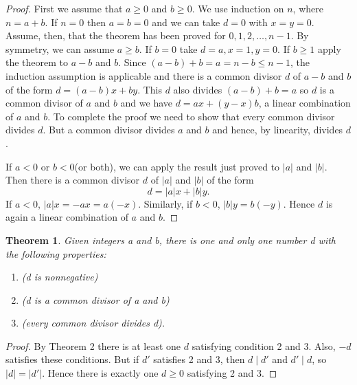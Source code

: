 \documentclass[11pt]{article}
\newtheorem{theorem}{Theorem}
\theoremstyle{definition}
\begin{document}
\begin{proof}
  First we assume that \(a \geq 0\) and \(b \geq 0\). We use induction on \(n\), where
  \(n = a + b\). If \(n = 0\) then \(a = b = 0\) and we can take \(d = 0\) with \(x
  = y = 0\). Assume, then, that the theorem has been proved for \(0,1,2,\ldots,n-1\).
  By symmetry, we can assume \(a \geq b\). If \(b = 0\) take \(d = a, x = 1, y = 0\).
  If \(b \geq 1\) apply the theorem to \(a - b\) and \(b\). Since \((a - b) + b =
  a = n - b \leq n - 1\), the induction assumption is applicable and there is a common
  divisor \(d\) of \(a - b\) and \(b\) of the form \(d = (a-b)x + by\). This \(d\)
  also divides \((a - b) + b = a\) so \(d\) is a common divisor of \(a\) and \(b\)
  and we have \(d = ax + (y - x)b\), a linear combination of \(a\) and \(b\). To
  complete the proof we need to show that every common divisor divides \(d\). But
  a common divisor divides \(a\) and \(b\) and hence, by linearity, divides \(d\).

  If \(a < 0\) or \(b < 0\)(or both), we can apply the result just proved to
  \(| a |\) and \(| b |\). Then there is a common divisor \(d\) of
  \(| a |\) and \(| b |\) of the form
  \[
  d = | a | x + | b | y.
  \]
  If \(a < 0\), \(| a | x = -ax = a(-x)\). Similarly, if \(b < 0\), \(|
  b | y = b(-y)\). Hence \(d\) is again a linear combination of \(a\) and \(b\).
\end{proof}

\begin{theorem}
  Given integers a and b, there is one and only one number d with the following properties:
  \begin{enumerate}
  \item {} (d is nonnegative)
  \item {} (d is a common divisor of a and b)
  \item {} (every common divisor divides d).
  \end{enumerate}
\end{theorem}

\begin{proof}
  By Theorem 2 there is at least one \(d\) satisfying condition 2 and 3. Also,
  \(-d\) satisfies these conditions. But if \(d'\) satisfies 2 and 3, then
  \(d \mid d'\) and \(d' \mid d\), so \(| d | = | d' |\). Hence
  there is exactly one \(d \geq 0\) satisfying 2 and 3.
\end{proof}
\end{document}
